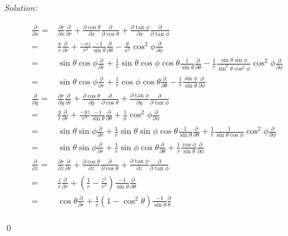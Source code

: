 \documentclass[12pt,a4paper]{article}
\newenvironment{sol}
    {\emph{Solution:}
    }
    {
    \qed
    }
\begin{document}
\begin{sol}
\begin{align}
\nonumber\frac{\partial}{\partial x}=&\frac{\partial r}{\partial x}\frac{\partial}{\partial r}+\frac{\partial\cos\theta}{\partial x}\frac{\partial}{\partial\cos\theta}+\frac{\partial\tan\phi}{\partial x}\frac{\partial}{\partial\tan\phi}\\
\nonumber=&\frac{x}{r}\frac{\partial}{\partial r}+\frac{-xz}{r^3}\frac{-1}{\sin\theta}\frac{\partial}{\partial\theta}-\frac{y}{x^2}\cos^2\phi\frac{\partial}{\partial\phi}\\
\nonumber=&\sin\theta\cos\phi\frac{\partial}{\partial r}+\frac{1}{r}\sin\theta\cos\phi\cos\theta\frac{1}{\sin\theta}\frac{\partial}{\partial\theta}-\frac{1}{r}\frac{\sin\theta\sin\phi}{\sin^2\theta\cos^2\phi}\cos^2\phi\frac{\partial}{\partial\phi}\\
=&\sin\theta\cos\phi\frac{\partial}{\partial r}+\frac{1}{r}\cos\phi\cos\theta\frac{\partial}{\partial\theta}-\frac{1}{r}\frac{\sin\phi}{\sin\theta}\frac{\partial}{\partial\phi}\\
\nonumber\frac{\partial}{\partial y}=&\frac{\partial r}{\partial y}\frac{\partial}{\partial r}+\frac{\partial\cos\theta}{\partial y}\frac{\partial}{\partial\cos\theta}+\frac{\partial\tan\phi}{\partial y}\frac{\partial}{\partial\tan\phi}\\
\nonumber=&\frac{y}{r}\frac{\partial}{\partial r}+\frac{-yz}{r^3}\frac{-1}{\sin\theta}\frac{\partial}{\partial\theta}+\frac{1}{x}\cos^2\phi\frac{\partial}{\partial\phi}\\
\nonumber=&\sin\theta\sin\phi\frac{\partial}{\partial r}+\frac{1}{r}\sin\theta\sin\phi\cos\theta\frac{1}{\sin\theta}\frac{\partial}{\partial\theta}+\frac{1}{r}\frac{1}{\sin\theta\cos\phi}\cos^2\phi\frac{\partial}{\partial\phi}\\
=&\sin\theta\sin\phi\frac{\partial}{\partial r}+\frac{1}{r}\sin\phi\cos\theta\frac{\partial}{\partial\theta}+\frac{1}{r}\frac{\cos\phi}{\sin\theta}\frac{\partial}{\partial\phi}\\
\nonumber\frac{\partial}{\partial z}=&\frac{\partial r}{\partial z}\frac{\partial}{\partial r}+\frac{\partial\cos\theta}{\partial z}\frac{\partial}{\partial\cos\theta}+\frac{\partial\tan\phi}{\partial z}\frac{\partial}{\partial\tan\phi}\\
\nonumber=&\frac{z}{r}\frac{\partial}{\partial r}+\left(\frac{1}{r}-\frac{z^2}{r^3}\right)\frac{-1}{\sin\theta}\frac{\partial}{\partial\theta}\\
\nonumber=&\cos\theta\frac{\partial}{\partial r}+\frac{1}{r}(1-\cos^2\theta)\frac{-1}{\sin\theta}\frac{\partial}{\theta}\\

\end{align}
\end{sol}
\end{document}
